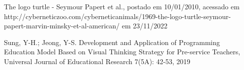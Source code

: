 \documentclass[
12pt,		%
openright,	%
twoside,  %
a4paper,			%
chapter=TITLE,		%
english,			%
french,				%
spanish,			%
brazil				%
]{USPSC-classe/USPSC}
\begin{document}
\begin{flushleft}
\begin{flushleft}
\begin{flushleft}
\begin{flushleft}
\begin{flushleft}
\begin{flushleft}
\begin{flushleft}
\begin{flushleft}
\begin{flushleft}
[CIBERNECTZOO, 2010] The logo turtle - Seymour Papert et al., postado em 10/01/2010, acessado em http://cyberneticzoo.com/cyberneticanimals/1969-the-logo-turtle-seymour-papert-marvin-minsky-et-al-american/ em 23/11/2022
\end{flushleft}


\end{flushleft}


\end{flushleft}


\end{flushleft}


\end{flushleft}


\end{flushleft}


\end{flushleft}


\end{flushleft}


\end{flushleft}


\begin{flushleft}
\begin{flushleft}
\begin{flushleft}
\begin{flushleft}
\begin{flushleft}
\begin{flushleft}
\begin{flushleft}
\begin{flushleft}
\begin{flushleft}
[SUNG, 2019] Sung, Y-H.; Jeong, Y-S. Development and Application of Programming Education Model Based on Visual Thinking Strategy for Pre-service Teachers, Universal Journal of Educational Research 7(5A): 42-53, 2019
\end{flushleft}


\end{flushleft}


\end{flushleft}


\end{flushleft}


\end{flushleft}


\end{flushleft}


\end{flushleft}


\end{flushleft}


\end{flushleft}
\end{document}
